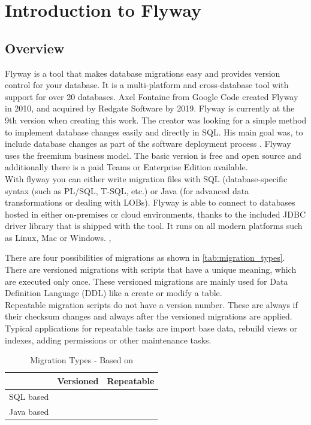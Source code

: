 

\chapter{Introduction to Flyway}


\section{Overview}
%
Flyway is a tool that makes database migrations easy and provides version control for your database. It is a multi-platform and cross-database tool with support for over 20 databases.
Axel Fontaine from Google Code created Flyway in 2010, and acquired by Redgate Software by 2019. Flyway is currently at the 9th version when creating this work. The creator was looking for a simple method to implement database changes easily and directly in SQL. His main goal was, to include database changes as part of the software deployment process \cite{Robles2021}.
Flyway uses the freemium business model.  The basic version is free and open source \cite{Fontaine2010} and additionally there is a paid Teams or Enterprise Edition available.\\
With flyway you can either write migration files with SQL (database-specific syntax (such as PL/SQL, T-SQL, etc.) or Java (for advanced data transformations or dealing with LOBs). Flyway is able to connect to databases hosted in either on-premises or cloud environments, thanks to the included JDBC driver library that is shipped with the tool. It runs on all modern platforms such as Linux, Mac or Windows.  \cite{Dillon2022}, \cite{DBMSTools}


%
There are four possibilities of migrations as shown in \autoref{tab:migration_types}. There are versioned migrations with scripts that have a unique meaning, which are executed only once. These versioned migrations are mainly used for Data Definition Language (DDL) like a create or modify a table. \\

Repeatable migration scripts do not have a version number. These are always if their checksum changes and always after the versioned migrations are applied. Typical applications for repeatable tasks are import base data, rebuild views or indexes, adding permissions or other maintenance tasks.

\begin{table}[h]
	\centering
	\begin{tabularx}{8cm}{X|c c}
		& Versioned & Repeatable \\ \hline
		SQL based & \checkmark & \checkmark \\
		Java based & \checkmark & \checkmark \\
	\end{tabularx}
	\caption{Migration Types - Based on \cite{Parsick2018}}
	\label{tab:migration_types}
\end{table}


